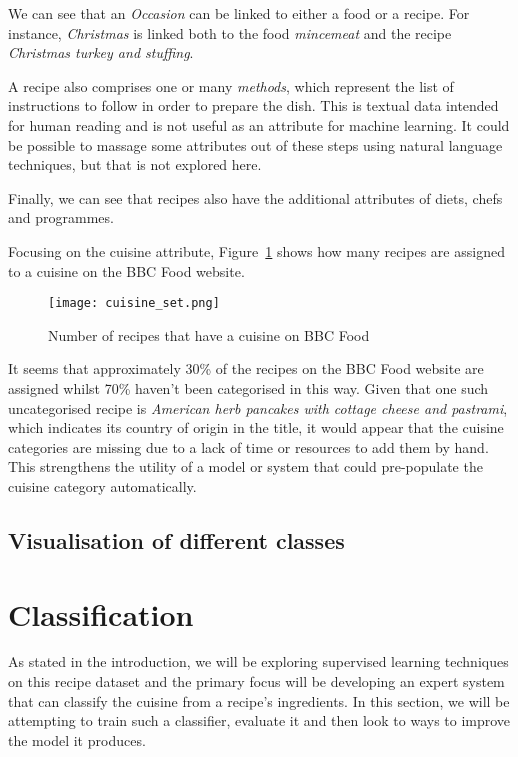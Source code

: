 \documentclass[11pt,a4paper]{article}
\begin{document}
We can see that an \emph{Occasion} can be linked to either a food or a recipe.
For instance, \emph{Christmas} is linked both to the food \emph{mincemeat} and
the recipe \emph{Christmas turkey and stuffing}.

A recipe also comprises one or many \emph{methods}, which represent the list
of instructions to follow in order to prepare the dish. This is textual data
intended for human reading and is not useful as an attribute for machine
learning. It could be possible to massage some attributes out of these steps
using natural language techniques, but that is not explored here.

Finally, we can see that recipes also have the additional attributes of
diets, chefs and programmes.

Focusing on the cuisine attribute, Figure~\ref{cuisine-set} shows how many
recipes are assigned to a cuisine on the BBC Food website.

\begin{figure}[p]
  \texttt{[image: cuisine\_set.png]}
  \caption{Number of recipes that have a cuisine on BBC Food\label{cuisine-set}}
\end{figure}

It seems that approximately 30\% of the recipes on the BBC Food website are
assigned whilst 70\% haven't been categorised in this way. Given that one
such uncategorised recipe is
\emph{American herb pancakes with cottage cheese and pastrami}, which indicates
its country of origin in the title, it would appear that the cuisine categories
are missing due to a lack of time or resources to add them by hand. This
strengthens the utility of a model or system that could pre-populate the cuisine
category automatically.

\subsection{Visualisation of different classes}


\section{Classification}

As stated in the introduction, we will be exploring supervised learning techniques
on this recipe dataset and the primary focus will be developing an expert system
that can classify the cuisine from a recipe's ingredients. In this section,
we will be attempting to train such a classifier, evaluate it and then
look to ways to improve the model it produces.
\end{document}

